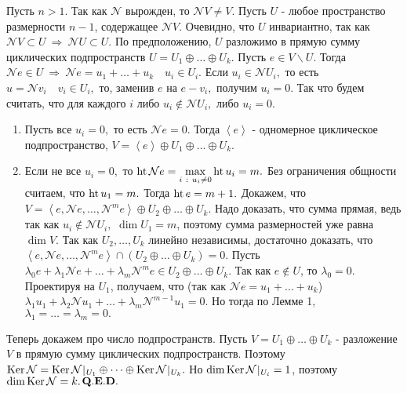 \documentclass[draft]{article}%
\newcommand{\ab}{\par\noindent}%
\newcommand{\qed}{\quad${{\bf Q.E.D.}}$}
\newcommand{\lob}[1]{\left\langle#1\right\rangle}%
\newcommand{\ps}{\oplus}
\newcommand{\rom}[1]{{\rm#1\,}}
\newcommand{\op}[1]{$\mathcal{#1}$}
\newcommand{\om}[1]{\mathcal{#1}}
\begin{document}
\ab Пусть $n>1$. Так как \op{N} вырожден, то $\om{N}V\ne V.$ Пусть $U$ - любое пространство размерности $n-1$,
содержащее $\om{N}V.$ Очевидно, что $U$ инвариантно, так как $\om{N}V\subset U\ \Rightarrow\ \om{N}U\subset U.$ %
По предположению, $U$ разложимо в прямую сумму циклических подпространств $U=U_1\ps\dots\ps U_k.$ Пусть $e\in
V\backslash U.$ Тогда $\om{N}e\in U\ \Rightarrow\ \om{N}e=u_1+\dots+u_k\quad u_i\in U_i.$ Если $u_i\in\om{N}U_i,$
то есть $u=\om{N}v_i\quad v_i\in U_i,$ то, заменив $e$ на $e-v_i,$ получим $u_i=0.$ Так что будем считать, что
для каждого $i$ либо $u_i\notin\om{N}U_i,$ либо $u_i=0.$
\begin{enumerate}
    \item Пусть все $u_i=0,$ то есть $\om{N}e=0.$ Тогда $\lob{e}$ - одномерное циклическое подпространство, $V=\lob{e}\ps U_1
    \ps\dots\ps U_k.$
    \item Если не все $u_i=0,$ то $\rom{ht}\om{N}e=\max\limits_{i\ :\ u_i\ne 0}\rom{ht}u_i=m.$ Без ограничения
    общности считаем, что $\rom{ht}u_1=m.$ Тогда $\rom{ht}e=m+1.$ Докажем, что $V=\lob{e,\om{N}e,\dots,\om{N}^me}\ps U_2\ps\dots\ps U_k.$
    Надо доказать, что сумма прямая, ведь так как $u_i\notin\om{N}U_i,$ $\dim U_1=m$, поэтому сумма размерностей
    уже равна $\dim V.$ Так как $U_2,\dots,U_k$ линейно независимы, достаточно доказать, что\\ $\lob{e,\om{N}e,\dots,\om{N}^me}\cap(U_2\ps\dots\ps U_k)=0.$
    Пусть $\lambda_0e+\lambda_1\om{N}e+\dots+\lambda_m\om{N}^me\in U_2\ps\dots\ps U_k.$ Так как $e\notin U$, то $\lambda_0=0.$
    Проектируя на $U_1$, получаем, что (так как $\om{N}e=u_1+\dots+u_k$) $\lambda_1u_1+\lambda_2\om{N}u_1+\dots+\lambda_m\om{N}^{m-1}u_1=0.$
    Но тогда по Лемме 1, $\lambda_1=\dots=\lambda_m=0.$
\end{enumerate}
\ab Теперь докажем про число подпространств. Пусть $V=U_1\ps\dots\ps U_k$ - разложение $V$ в прямую сумму
циклических подпространств. Поэтому
$\rom{Ker}\om{N}=\rom{Ker}\om{N}\,\vrule\,_{U_1}\ps\dots\ps\rom{Ker}\om{N}\,\vrule\,_{U_k}.$ Но
$\dim\rom{Ker}\om{N}\,\vrule\,_{U_i}=1$, поэтому $\dim\rom{Ker}\om{N}=k.$\qed
\end{document}
